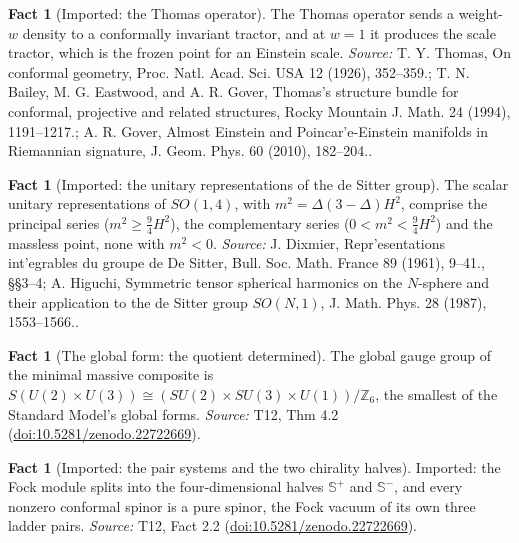 \documentclass[11pt]{article}
\theoremstyle{definition}
\newtheorem{fact}[theorem]{Fact}
\theoremstyle{plain}
\providecommand{\CS}{}\renewcommand{\CS}{{\mathbb{S}^{+}}}
\providecommand{\CSm}{}\renewcommand{\CSm}{{\mathbb{S}^{-}}}
\begin{document}
\begin{fact}[Imported: the Thomas operator]\label{c:mass.imported-thomas-operator}
The Thomas operator sends a weight-$w$ density to a conformally invariant tractor, and at $w = 1$ it produces the scale tractor, which is the frozen point for an Einstein scale.
\emph{Source:} T. Y. Thomas, On conformal geometry, Proc. Natl. Acad. Sci. USA 12 (1926), 352--359.; T. N. Bailey, M. G. Eastwood, and A. R. Gover, Thomas's structure bundle for conformal, projective and related structures, Rocky Mountain J. Math. 24 (1994), 1191--1217.; A. R. Gover, Almost Einstein and Poincar'e-Einstein manifolds in Riemannian signature, J. Geom. Phys. 60 (2010), 182--204..
\end{fact}

\begin{fact}[Imported: the unitary representations of the de Sitter group]\label{c:mass.imported-unitary-representations-de-sitter-group}
The scalar unitary representations of $SO(1,4)$, with $m^{2} = \Delta(3-\Delta)H^{2}$, comprise the principal series ($m^{2} \ge \tfrac94 H^{2}$), the complementary series ($0 < m^{2} < \tfrac94 H^{2}$) and the massless point, none with $m^{2} < 0$.
\emph{Source:} J. Dixmier, Repr'esentations int'egrables du groupe de De Sitter, Bull. Soc. Math. France 89 (1961), 9--41., \S\S3--4; A. Higuchi, Symmetric tensor spherical harmonics on the $N$-sphere and their application to the de Sitter group $SO(N,1)$, J. Math. Phys. 28 (1987), 1553--1566..
\end{fact}

\begin{fact}[The global form: the quotient determined]\label{c:standard-model.global-form-quotient-determined}
The global gauge group of the minimal massive composite is $S(U(2) \times U(3)) \cong (SU(2) \times SU(3) \times U(1))/\mathbb{Z}_{6}$, the smallest of the Standard Model's global forms.
\emph{Source:} T12, Thm 4.2 (\href{https://doi.org/10.5281/zenodo.22722669}{doi:10.5281/zenodo.22722669}).
\end{fact}

\begin{fact}[Imported: the pair systems and the two chirality halves]\label{c:standard-model.imported-pair-systems-two-chirality-halves}
Imported: the Fock module splits into the four-dimensional halves $\CS$ and $\CSm$, and every nonzero conformal spinor is a pure spinor, the Fock vacuum of its own three ladder pairs.
\emph{Source:} T12, Fact 2.2 (\href{https://doi.org/10.5281/zenodo.22722669}{doi:10.5281/zenodo.22722669}).
\end{fact}
\end{document}
